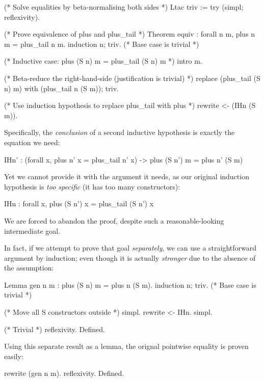\begin{coqblock}
(* Solve equalities by beta-normalising both sides *)
Ltac triv := try (simpl; reflexivity).

(* Prove equivalence of plus and plus_tail *)
Theorem equiv : forall n m, plus n m = plus_tail n m.
  induction n; triv. (* Base case is trivial *)

  (* Inductive case: plus (S n) m = plus_tail (S n) m *)
  intro m.

  (* Beta-reduce the right-hand-side (justification is trivial) *)
  replace (plus_tail (S n) m) with (plus_tail n (S m)); triv.

  (* Use induction hypothesis to replace plus_tail with plus *)
  rewrite <- (IHn (S m)).
\end{coqblock}

Specifically, the \emph{conclusion} of a second inductive hypothesis is exactly
the equation we need:

\begin{coqblock}
IHn' : (forall x, plus n' x = plus_tail n' x) -> plus (S n') m = plus n' (S m)
\end{coqblock}

Yet we cannot provide it with the argument it needs, as our original induction
hypothesis is \emph{too specific} (it has too many  constructors):

\begin{coqblock}
IHn : forall x, plus (S n') x = plus_tail (S n') x
\end{coqblock}

We are forced to abandon the proof, despite such a reasonable-looking
intermediate goal.

In fact, if we attempt to prove that goal \emph{separately}, we can use a
straightforward argument by induction; even though it is actually
\emph{stronger} due to the absence of the  assumption:

\begin{coqblock}
Lemma gen n m : plus (S n) m = plus n (S m).
  induction n; triv. (* Base case is trivial *)

  (* Move all S constructors outside *)
  simpl. rewrite <- IHn. simpl.

  (* Trivial *)
  reflexivity.
Defined.
\end{coqblock}

Using this separate result as a lemma, the orignal pointwise equality is proven
easily:

\begin{coqblock}
  rewrite (gen n m).
  reflexivity.
Defined.
\end{coqblock}

